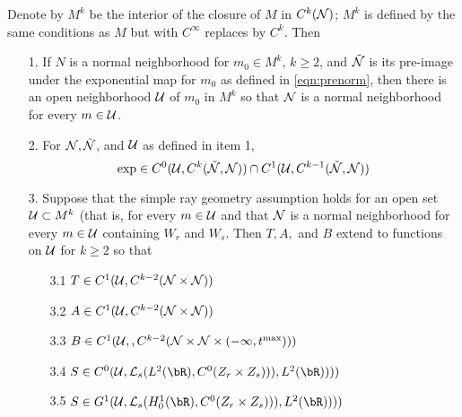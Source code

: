 \begin{theorem}
\label{thm:smdep}
Denote by $M^k$ be the interior of the closure of $M$ in $C^k({\cal
  N})$; $M^k$ is defined by the same conditions as $M$ but with
$C^{\infty}$ replaces by $C^k$.  Then
\begin{itemize}

\item[1. ] If $N$ is a normal neighborhood for $m_0 \in M^k$,
  $k \ge 2$, and $\tilde{\cal N}$ is its pre-image under the
  exponential map for $m_0$ as defined in \ref{eqn:prenorm}, then there is an open neighborhood ${\cal U}$ of $m_0$ in
  $M^k$ so that ${\cal N}$ is a normal neighborhood for every
  $m \in {\cal U}$.
\item[2. ] For ${\cal N}, \tilde{\cal N}$, and ${\cal U}$ as defined
  in item 1, 
\begin{equation}
\label{eqn:expreg}
\exp \in C^0({\cal U}, C^k(\tilde{\cal N},{\cal N})) \cap C^1({\cal
  U}, C^{k-1}(\tilde{\cal N},{\cal N}))
\end{equation}
\item[3. ] Suppose that the simple ray geometry assumption holds for
an open set ${\cal U} \subset M^k$ (that is, for every $m \in {\cal
  U}$ and that ${\cal N}$ is a normal neighborhood for every $m \in
{\cal U}$ containing $W_r$ and $W_s$. Then $T, A,$ and
$B$ extend to functions on ${\cal U}$ for $k \ge 2$ so that
\begin{itemize}
\item[3.1 ]$T \in C^1({\cal U},C^{k-2}({\cal N}\times{\cal N}))$ 
\item[3.2 ]$A \in C^1({\cal U},C^{k-2}({\cal N}\times{\cal N}))$ 
\item[3.3 ]$B \in C^1({\cal U},,C^{k-2}({\cal N}\times{\cal N}\times(-\infty,t^{\rm
    max})))$
\item[3.4 ]$S \in C^0({\cal U},{\cal L}_s(L^2(\bR),
C^0(Z_r\times Z_s))),
  L^2(\bR))))$
\item[3.5 ]$S \in G^1({\cal U},{\cal L}_s(H^1_0(\bR),
C^0(Z_r\times Z_s))),
  L^2(\bR))))$
\end{itemize} 
\end{itemize}
\end{theorem}
